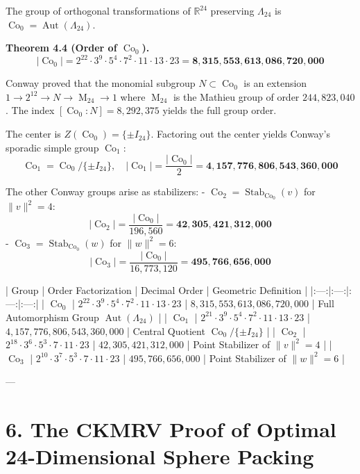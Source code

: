 \documentclass[11pt,twoside,openright]{amsbook}
\begin{document}
The group of orthogonal transformations of $\mathbb{R}^{24}$ preserving $\Lambda_{24}$ is $\operatorname{Co}_0 = \operatorname{Aut}(\Lambda_{24})$.

\textbf{Theorem 4.4 (Order of $\operatorname{Co}_0$).}
$$|\operatorname{Co}_0| = 2^{22} \cdot 3^9 \cdot 5^4 \cdot 7^2 \cdot 11 \cdot 13 \cdot 23 = \mathbf{8,315,553,613,086,720,000}$$

Conway proved that the monomial subgroup $N \subset \operatorname{Co}_0$ is an extension $1 \to 2^{12} \to N \to \operatorname{M}_{24} \to 1$ where $\operatorname{M}_{24}$ is the Mathieu group of order $244,823,040$. The index $[\operatorname{Co}_0 : N] = 8,292,375$ yields the full group order.

The center is $Z(\operatorname{Co}_0) = \{ \pm I_{24} \}$. Factoring out the center yields Conway's sporadic simple group $\operatorname{Co}_1$:
$$\operatorname{Co}_1 = \operatorname{Co}_0 / \{ \pm I_{24} \}, \quad |\operatorname{Co}_1| = \frac{|\operatorname{Co}_0|}{2} = \mathbf{4,157,776,806,543,360,000}$$

The other Conway groups arise as stabilizers:
- \textbf{$\operatorname{Co}_2 = \operatorname{Stab}_{\operatorname{Co}_0}(v)$} for $\|v\|^2 = 4$:
  $$|\operatorname{Co}_2| = \frac{|\operatorname{Co}_0|}{196,560} = \mathbf{42,305,421,312,000}$$
- \textbf{$\operatorname{Co}_3 = \operatorname{Stab}_{\operatorname{Co}_0}(w)$} for $\|w\|^2 = 6$:
  $$|\operatorname{Co}_3| = \frac{|\operatorname{Co}_0|}{16,773,120} = \mathbf{495,766,656,000}$$

| Group | Order Factorization | Decimal Order | Geometric Definition |
|:---:|:---:|:---:|:---:|
| $\operatorname{Co}_0$ | $2^{22} \cdot 3^9 \cdot 5^4 \cdot 7^2 \cdot 11 \cdot 13 \cdot 23$ | $8,315,553,613,086,720,000$ | Full Automorphism Group $\operatorname{Aut}(\Lambda_{24})$ |
| $\operatorname{Co}_1$ | $2^{21} \cdot 3^9 \cdot 5^4 \cdot 7^2 \cdot 11 \cdot 13 \cdot 23$ | $4,157,776,806,543,360,000$ | Central Quotient $\operatorname{Co}_0 / \{\pm I_{24}\}$ |
| $\operatorname{Co}_2$ | $2^{18} \cdot 3^6 \cdot 5^3 \cdot 7 \cdot 11 \cdot 23$ | $42,305,421,312,000$ | Point Stabilizer of $\|v\|^2 = 4$ |
| $\operatorname{Co}_3$ | $2^{10} \cdot 3^7 \cdot 5^3 \cdot 7 \cdot 11 \cdot 23$ | $495,766,656,000$ | Point Stabilizer of $\|w\|^2 = 6$ |

---

\section{6. The CKMRV Proof of Optimal 24-Dimensional Sphere Packing}
\end{document}
